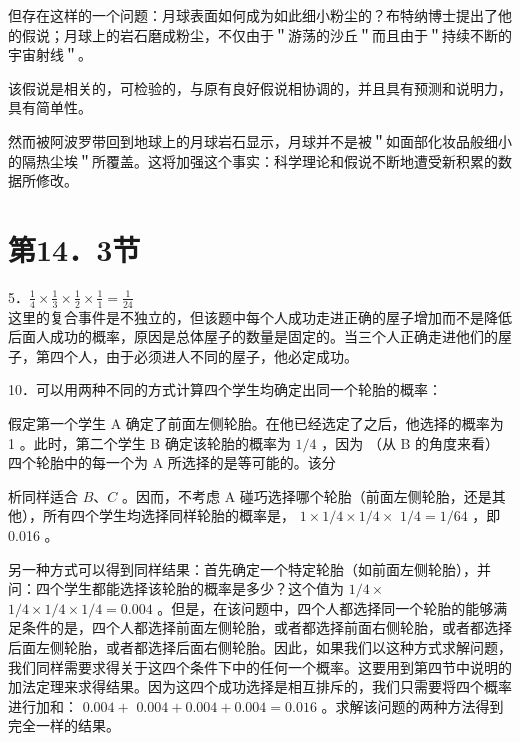 但存在这样的一个问题：月球表面如何成为如此细小粉尘的？布特纳博士提出了他的假说；月球上的岩石磨成粉尘，不仅由于＂游荡的沙丘＂而且由于＂持续不断的宇宙射线＂。

该假说是相关的，可检验的，与原有良好假说相协调的，并且具有预测和说明力，具有简单性。

然而被阿波罗带回到地球上的月球岩石显示，月球并不是被＂如面部化妆品般细小的隔热尘埃＂所覆盖。这将加强这个事实：科学理论和假说不断地遭受新积累的数据所修改。

\section*{第14．3节}
5．$\frac{1}{4} \times \frac{1}{3} \times \frac{1}{2} \times \frac{1}{1}=\frac{1}{24}$\\
这里的复合事件是不独立的，但该题中每个人成功走进正确的屋子增加而不是降低后面人成功的概率，原因是总体屋子的数量是固定的。当三个人正确走进他们的屋子，第四个人，由于必须进人不同的屋子，他必定成功。

10．可以用两种不同的方式计算四个学生均确定出同一个轮胎的概率：

假定第一个学生 A 确定了前面左侧轮胎。在他已经选定了之后，他选择的概率为 1 。此时，第二个学生 B 确定该轮胎的概率为 $1 / 4$ ，因为 （从 B 的角度来看）四个轮胎中的每一个为 A 所选择的是等可能的。该分

析同样适合 $B 、 C$ 。因而，不考虑 A 碰巧选择哪个轮胎（前面左侧轮胎，还是其他），所有四个学生均选择同样轮胎的概率是， $1 \times 1 / 4 \times 1 / 4 \times$ $1 / 4=1 / 64$ ，即 0.016 。

另一种方式可以得到同样结果：首先确定一个特定轮胎（如前面左侧轮胎），并问：四个学生都能选择该轮胎的概率是多少？这个值为 $1 / 4 \times$ $1 / 4 \times 1 / 4 \times 1 / 4=0.004$ 。但是，在该问题中，四个人都选择同一个轮胎的能够满足条件的是，四个人都选择前面左侧轮胎，或者都选择前面右侧轮胎，或者都选择后面左侧轮胎，或者都选择后面右侧轮胎。因此，如果我们以这种方式求解问题，我们同样需要求得关于这四个条件下中的任何一个概率。这要用到第四节中说明的加法定理来求得结果。因为这四个成功选择是相互排斥的，我们只需要将四个概率进行加和： $0.004+$ $0.004+0.004+0.004=0.016$ 。求解该问题的两种方法得到完全一样的结果。

